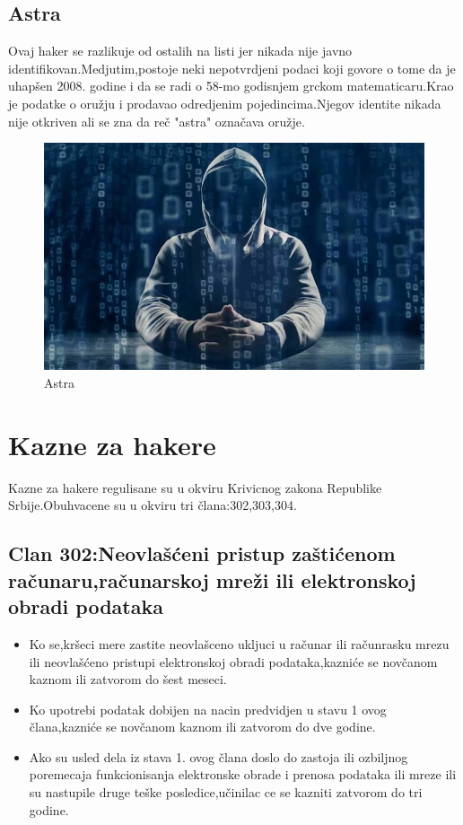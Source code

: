 \documentclass[a4paper]{article}
\begin{document}
\subsection{Astra}
Ovaj haker se razlikuje od ostalih na listi jer nikada nije javno identifikovan.Medjutim,postoje neki nepotvrdjeni podaci koji govore o tome da je uhapšen 2008. godine i da se radi o 58-mo godisnjem grckom matematicaru.Krao je podatke o oružju i prodavao odredjenim pojedincima.Njegov identite nikada nije otkriven ali se zna da reč "astra" označava oružje.
\begin{figure}[h!]
	\begin{center}
		\includegraphics[scale=0.20]{astra.jpg}
	\end{center}
	\caption{Astra}
	\label{fig:astra}
\end{figure}
\newpage
\section{Kazne za hakere}
\label{kazne}
Kazne za hakere regulisane su u okviru Krivicnog zakona Republike Srbije.Obuhvacene su u okviru tri člana:302,303,304.
\subsection{Clan 302:Neovlašćeni pristup zaštićenom računaru,računarskoj mreži ili elektronskoj obradi podataka}
\begin{itemize}
	\item Ko se,kršeci mere zastite neovlašceno ukljuci u računar ili računrasku mrezu ili neovlašćeno pristupi elektronskoj obradi podataka,kazniće se novčanom kaznom ili zatvorom do šest meseci.
	\item Ko upotrebi podatak dobijen na nacin predvidjen u stavu 1 ovog člana,kazniće se novčanom kaznom ili zatvorom do dve godine.
	\item Ako su usled dela iz stava 1. ovog člana doslo do zastoja ili ozbiljnog poremecaja funkcionisanja elektronske obrade i prenosa podataka ili mreze ili su nastupile druge teške posledice,učinilac ce se kazniti zatvorom do tri godine.
\end{itemize}
\end{document}
